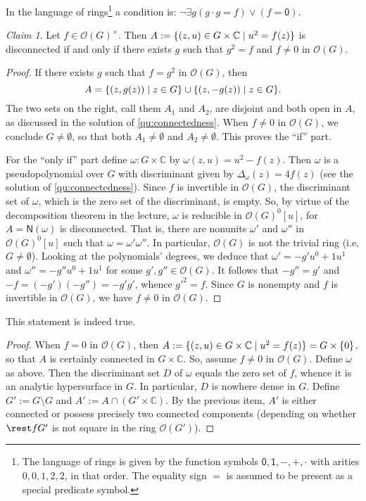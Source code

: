 \documentclass[a4paper]{amsart}
\newcommand{\C}{\mathbb{C}}
\newcommand{\Zero}[1]{\mathsf{N}(#1)}
\renewcommand{\O}{\mathcal{O}}
\theoremstyle{remark}
\newtheorem{claim}{Claim}[question]
\numberwithin{equation}{question}
\DeclarePairedDelimiter\set{\{}{\}}
\begin{document}
\begin{solution}%
\begin{solenum}
\item In the language of rings\footnote{The language of rings is given by the function symbols $\mathsf0,\mathsf1,{-},{+},{\cdot}$ with arities $0,0,1,2,2$, in that order. The equality sign $=$ is assumed to be present as a special predicate symbol.} a condition is: $\neg\exists g(g \cdot g = f) \lor (f = \mathsf0)$.
\begin{claim}
Let $f \in \O(G)^\times$. Then $A := \set{(z,u) \in G \times \C \mid u^2 = f(z)}$ is disconnected if and only if there exists $g$ such that $g^2 = f$ and $f \ne 0$ in $\O(G)$.
\end{claim}
\begin{proof}
If there exists $g$ such that $f = g^2$ in $\O(G)$, then
\[
A = \set{(z,g(z)) \mid z \in G} \cup \set{(z,-g(z)) \mid z \in G}.
\]
The two sets on the right, call them $A_1$ and $A_2$, are disjoint and both open in $A$, as discussed in the solution of \cref{qu:connectedness}. When $f \ne 0$ in $\O(G)$, we conclude $G \ne \emptyset$, so that both $A_1 \ne \emptyset$ and $A_2 \ne \emptyset$. This proves the “if” part.

For the “only if” part define $\omega \colon G \times \C$ by $\omega(z,u) = u^2 - f(z)$. Then $\omega$ is a pseudopolynomial over $G$ with discriminant given by $\Delta_\omega(z) = 4f(z)$ (see the solution of \cref{qu:connectedness}). Since $f$ is invertible in $\O(G)$, the discriminant set of $\omega$, which is the zero set of the discriminant, is empty. So, by virtue of the decomposition theorem in the lecture, $\omega$ is reducible in $\O(G)^0[u]$, for $A = \Zero\omega$ is disconnected. That is, there are nonunits $\omega'$ and $\omega''$ in $\O(G)^0[u]$ such that $\omega = \omega'\omega''$. In particular, $\O(G)$ is not the trivial ring (i.e, $G \ne \emptyset$). Looking at the polynomials' degrees, we deduce that $\omega' = -g'u^0 + 1u^1$ and $\omega'' = -g''u^0 + 1u^1$ for some $g',g'' \in \O(G)$. It follows that $-g'' = g'$ and $-f = (-g')(-g'') = -g'g'$, whence $g'^2 = f$. Since $G$ is nonempty and $f$ is invertible in $\O(G)$, we have $f \ne 0$ in $\O(G)$.
\end{proof}

\item This statement is indeed true.
\begin{proof}
When $f = 0$ in $\O(G)$, then $A := \set{(z,u) \in G \times \C \mid u^2 = f(z)} = G \times \set0$, so that $A$ is certainly connected in $G \times \C$. So, assume $f \ne 0$ in $\O(G)$. Define $\omega$ as above. Then the discriminant set $D$ of $\omega$ equals the zero set of $f$, whence it is an analytic hypersurface in $G$. In particular, $D$ is nowhere dense in $G$. Define $G' := G \setminus G$ and $A' := A \cap (G' \times \C)$. By the previous item, $A'$ is either connected or possess precisely two connected components (depending on whether $\rest f{G'}$ is not square in the ring $\O(G')$).


\end{proof}
\end{solenum}
\end{solution}
\end{document}
